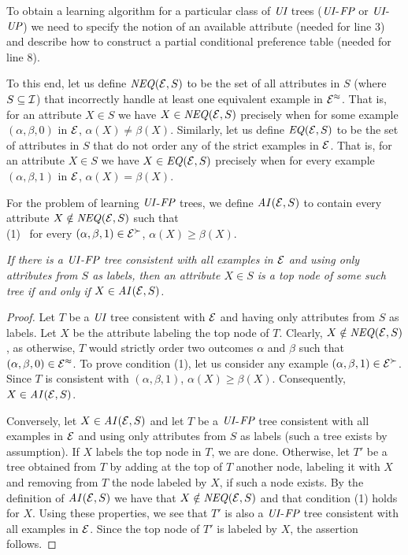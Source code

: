To obtain a learning algorithm for a particular class of $\textit{UI}$ trees
($\textit{UI}$-$\textit{FP}$ or $\textit{UI}$-$\textit{UP}$) we need to specify the notion 
of an available attribute (needed for line 3) and describe how to construct 
a partial conditional preference table (needed for line 8). 

To this end, let us define $\mathit{NEQ}(\mathcal{E},S)$ to be the set of all attributes in
$S$ (where $S\subseteq \mathcal{I}$) that incorrectly handle at least one equivalent example 
in $\mathcal{E}^\approx$. That is, for an attribute $X\in S$ we have $X\in \mathit{NEQ}(\mathcal{E},S)$
precisely when for some example $(\alpha,\beta,0)$ in $\mathcal{E}$, $\alpha(X)\not=
\beta(X)$. Similarly, let us define $\mathit{EQ}(\mathcal{E},S)$ to be the set of 
attributes in $S$ that do not order any of the strict examples in $\mathcal{E}$. That 
is, for an attribute $X\in S$ we have $X\in \mathit{EQ}(\mathcal{E},S)$ precisely when 
for every example $(\alpha,\beta,1)$ in $\mathcal{E}$, $\alpha(X)= \beta(X)$.  

For the problem of learning $\textit{UI}$-$\textit{FP}$ trees, we define $\mathit{AI}(\mathcal{E},S)$ to
contain every attribute $X\notin \mathit{NEQ}(\mathcal{E},S)$ such that\\ 
(1) \ for every $(\alpha,\beta,1) \in \mathcal{E}^\succ$, $\alpha(X) 
\geq \beta(X)$.

\begin{prop}
\label{prop:1}
{\it If there is a $\textit{UI}$-$\textit{FP}$ tree consistent with all examples in $\mathcal{E}$ and 
using only attributes from $S$ as labels, then an attribute $X\in S$ is a top node
of some such tree if and only if $X\in \mathit{AI}(\mathcal{E},S)$.}
\end{prop}
\begin{proof}
Let $T$ be a $\textit{UI}$ tree consistent with $\mathcal{E}$ and having only attributes from 
$S$ as labels. Let $X$ be the attribute labeling the top node of $T$. Clearly,
$X\notin \mathit{NEQ}(\mathcal{E},S)$, as otherwise, $T$ would strictly order two outcomes
$\alpha$ and $\beta$ such that $(\alpha,\beta,0)\in \mathcal{E}^\approx$. To prove
condition (1), let us consider any example $(\alpha,\beta,1)\in \mathcal{E}^\succ$. 
Since $T$ is consistent with $(\alpha,\beta,1)$, $\alpha(X)\geq\beta(X)$. 
Consequently, $X\in \mathit{AI}(\mathcal{E},S)$.

Conversely, let $X\in \mathit{AI}(\mathcal{E},S)$ and let $T$ be a $\textit{UI}$-$\textit{FP}$ tree 
consistent with all examples in $\mathcal{E}$ and using only attributes from $S$ as 
labels (such a tree exists by assumption). If $X$ labels the top node in 
$T$, we are done. Otherwise, let $T'$ be a tree obtained from $T$ by 
adding at the top of $T$ another node, labeling it with $X$ and removing
from $T$ the node labeled by $X$, if such a node exists. By the definition
of $\mathit{AI}(\mathcal{E},S)$ we have that $X\notin\mathit{NEQ}(\mathcal{E},S)$ and that condition (1) 
holds for $X$. Using these properties, we see that $T'$ is also 
a $\textit{UI}$-$\textit{FP}$ 
tree consistent with all examples in $\mathcal{E}$. Since the top node of $T'$
is labeled by $X$, the assertion follows. 
\end{proof}

